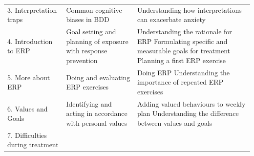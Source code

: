 \documentclass[]{book}
\begin{document}
\begin{longtable}[]{@{}lll@{}}
\begin{minipage}[t]{0.33\columnwidth}
3. Interpretation traps\strut
\end{minipage} & \begin{minipage}[t]{0.33\columnwidth}\raggedright
Common cognitive biases in BDD\strut
\end{minipage} & \begin{minipage}[t]{0.25\columnwidth}\raggedright
Understanding how interpretations can exacerbate anxiety\strut
\end{minipage}\tabularnewline
\begin{minipage}[t]{0.33\columnwidth}\raggedright
4. Introduction to ERP\strut
\end{minipage} & \begin{minipage}[t]{0.33\columnwidth}\raggedright
Goal setting and planning of exposure with response prevention\strut
\end{minipage} & \begin{minipage}[t]{0.25\columnwidth}\raggedright
Understanding the rationale for ERP Formulating specific and measurable goals for treatment Planning a first ERP exercise\strut
\end{minipage}\tabularnewline
\begin{minipage}[t]{0.33\columnwidth}\raggedright
5. More about ERP\strut
\end{minipage} & \begin{minipage}[t]{0.33\columnwidth}\raggedright
Doing and evaluating ERP exercises\strut
\end{minipage} & \begin{minipage}[t]{0.25\columnwidth}\raggedright
Doing ERP Understanding the importance of repeated ERP exercises\strut
\end{minipage}\tabularnewline
\begin{minipage}[t]{0.33\columnwidth}\raggedright
6. Values and Goals\strut
\end{minipage} & \begin{minipage}[t]{0.33\columnwidth}\raggedright
Identifying and acting in accordance with personal values\strut
\end{minipage} & \begin{minipage}[t]{0.25\columnwidth}\raggedright
Adding valued behaviours to weekly plan Understanding the difference between values and goals\strut
\end{minipage}\tabularnewline
\begin{minipage}[t]{0.33\columnwidth}\raggedright
7. Difficulties during treatment\strut
\end{minipage} & \begin{minipage}[t]{0.33\columnwidth}\raggedright

\end{minipage}
\end{longtable}
\end{document}
